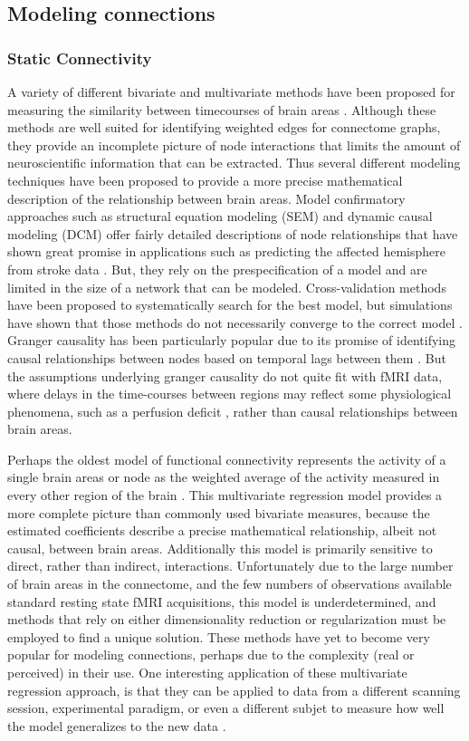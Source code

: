 \subsection{Modeling connections}

\subsubsection{Static Connectivity}
A variety of different bivariate and multivariate methods have been proposed for measuring the
similarity between timecourses of brain areas \citep{SmithNeuor2010,Varoquaux}. Although these
methods are well suited for identifying weighted edges for connectome graphs, they provide an
incomplete picture of node interactions that limits the amount of neuroscientific information
that can be extracted.  Thus several different modeling techniques have been proposed 
to provide a more precise mathematical description of the relationship between brain areas. Model
confirmatory approaches such as structural equation modeling (SEM) and dynamic causal modeling (DCM)
offer fairly detailed descriptions of node relationships that have shown great promise in applications
such as predicting the affected hemisphere from stroke data \cite{GAJames}. But, they rely on the
prespecification of a model and are limited in the size of a network that can be modeled. Cross-validation
methods have been proposed to systematically search for the best model, but simulations have shown that
those methods do not necessarily converge to the correct model \cite{lohman}. Granger causality has 
been particularly popular due to its promise of identifying causal relationships between nodes based on
temporal lags between them \cite{}. But the assumptions underlying granger causality do not quite fit with 
fMRI data, where delays in the time-courses between regions may reflect some physiological 
phenomena, such as a perfusion deficit \cite{Lv}, rather than causal relationships between brain areas. 

Perhaps the oldest model of functional connectivity represents the activity of a single brain areas
or node as the weighted average of the activity measured in every other region of the brain \cite{Firston, 1993}. 
This multivariate regression model provides a more complete picture than commonly used bivariate measures, because the estimated 
coefficients describe a precise mathematical relationship, albeit not causal, between brain areas. Additionally this model
is primarily sensitive to direct, rather than indirect, interactions. Unfortunately due to the large number of brain areas in the connectome, and the 
few numbers of observations available standard resting state fMRI acquisitions, this model is underdetermined, and methods
that rely on either dimensionality reduction \cite{Friston1993} or regularization \cite{Gael, Craddock, etc} must be employed to find a unique solution. These methods have yet to become very popular for modeling connections, perhaps due to the complexity (real or perceived) in their use. One interesting
application of these multivariate regression approach, is that they can be applied to data from a different scanning session, experimental paradigm,
or even a different subjet to measure how well the model generalizes to the new data \cite{Craddock}. 

